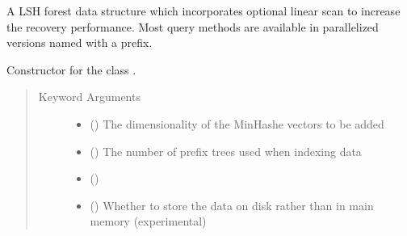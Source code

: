 \documentclass[letterpaper,10pt,english]{sphinxmanual}
\begin{document}
\begin{fulllineitems}
\label{\detokenize{documentation:tmap.LSHForest}}
A LSH forest data structure which incorporates optional linear scan to increase the recovery performance. Most query methods are available in parallelized versions named with a  prefix.

Constructor for the class {\hyperref[\detokenize{documentation:tmap.LSHForest}]{}}.
\begin{quote}\begin{description}
\item[{Keyword Arguments}] \leavevmode\begin{itemize}
\item {} 
 () \textendash{} The dimensionality of the MinHashe vectors to be added

\item {} 
 () \textendash{} The number of prefix trees used when indexing data

\item {} 
 () \textendash{} 

\item {} 
 () Whether to store the data on disk rather than in main memory (experimental) \textendash{} 

\end{itemize}

\end{description}\end{quote}


\end{fulllineitems}
\end{document}
